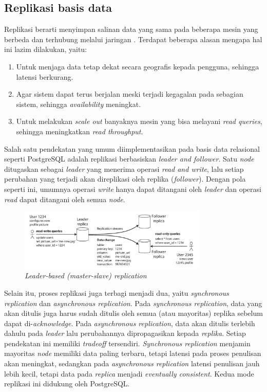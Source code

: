 \subsection{Replikasi basis data}

Replikasi berarti menyimpan salinan data yang sama pada beberapa mesin yang berbeda dan terhubung melalui jaringan \parencite{dataIntensiveApplications}. Terdapat beberapa alasan mengapa hal ini lazim dilakukan, yaitu:

\begin{enumerate}
    \item Untuk menjaga data tetap dekat secara geografis kepada pengguna, sehingga latensi berkurang.
    \item Agar sistem dapat terus berjalan meski terjadi kegagalan pada sebagian sistem, sehingga \textit{availability} meningkat.
    \item Untuk melakukan \textit{scale out} banyaknya mesin yang bisa melayani \textit{read queries}, sehingga meningkatkan \textit{read throughput}.
\end{enumerate}

Salah satu pendekatan yang umum diimplementasikan pada basis data relasional seperti PostgreSQL adalah replikasi berbasiskan \textit{leader and follower}. Satu \textit{node} ditugaskan sebagai \textit{leader} yang menerima operasi \textit{read and write}, lalu setiap perubahan yang terjadi akan direplikasi oleh replika (\textit{follower}). Dengan pola seperti ini, umumnya operasi \textit{write} hanya dapat ditangani oleh \textit{leader} dan operasi \textit{read} dapat ditangani oleh semua \textit{node}.

\begin{figure}[ht]
    \centering
    \includegraphics[width=0.8\textwidth]{resources/chapter-2/leader-based-replication.png}
    \caption{\textit{Leader-based (master-slave) replication \parencite{dataIntensiveApplications}}}
    \label{fig:leader-based-replication}
\end{figure}

Selain itu, proses replikasi juga terbagi menjadi dua, yaitu \textit{synchronous replication} dan \textit{asynchronous replication}. Pada \textit{synchronous replication}, data yang akan ditulis juga harus sudah ditulis oleh semua (atau mayoritas) replika sebelum dapat di-\textit{acknowledge}. Pada \textit{asynchronous replication}, data akan ditulis terlebih dahulu pada \textit{leader} lalu perubahannya dipropagasikan kepada \textit{replika}. Setiap pendekatan ini memiliki \textit{tradeoff} tersendiri. \textit{Synchronous replication} menjamin mayoritas \textit{node} memiliki data paling terbaru, tetapi latensi pada proses penulisan akan meningkat, sedangkan pada \textit{asynchronous replication} latensi penulisan jauh lebih kecil, tetapi data pada \textit{replica} menjadi \textit{eventually consistent}. Kedua mode replikasi ini didukung oleh PostgreSQL.
